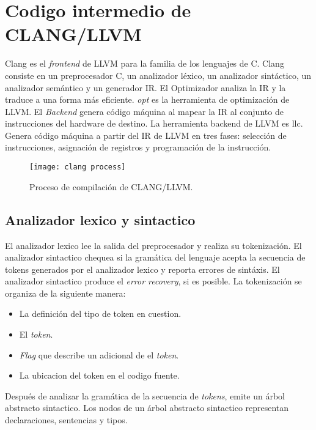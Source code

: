 \chapter{Codigo intermedio de CLANG/LLVM}

Clang es el \emph{frontend} de LLVM para la familia de los lenguajes de C. Clang consiste 
en un preprocesador C, un analizador léxico, un analizador sintáctico, un analizador 
semántico y un generador IR.
El Optimizador analiza la IR y la traduce a una forma más eficiente. \emph{opt} es la 
herramienta de optimización de LLVM.
El \emph{Backend} genera código máquina al mapear la IR al conjunto de instrucciones del 
hardware de destino. La herramienta backend de LLVM es llc. 
Genera código máquina a partir del IR de LLVM en tres fases: selección de instrucciones, 
asignación de registros y programación de la instrucción.

\begin{figure}[ht]
    \begingroup
        \centering
            \texttt{[image: clang process]}
            \caption{Proceso de compilación de CLANG/LLVM.}
            \label{fig:clang process}
        \par
    \endgroup
\end{figure}

\section{Analizador lexico y sintactico}

El analizador lexico lee la salida del preprocesador y realiza su tokenización.
El analizador sintactico chequea si la gramática del lenguaje acepta la 
secuencia de tokens generados por el analizador lexico y reporta errores de sintáxis.
El analizador sintactico produce el \emph{error recovery}, si es posible.
La tokenización se organiza de la siguiente manera:
\begin{itemize}
    \item La definición del tipo de token en cuestion.
    \item El \emph{token}.
    \item \emph{Flag} que describe un adicional de el \emph{token}.
    \item La ubicacion del token en el codigo fuente.
\end{itemize}
Después de analizar la gramática de la secuencia de \emph{tokens}, 
emite un árbol abstracto sintactico. Los nodos de un árbol abstracto sintactico 
representan declaraciones, sentencias y tipos.

